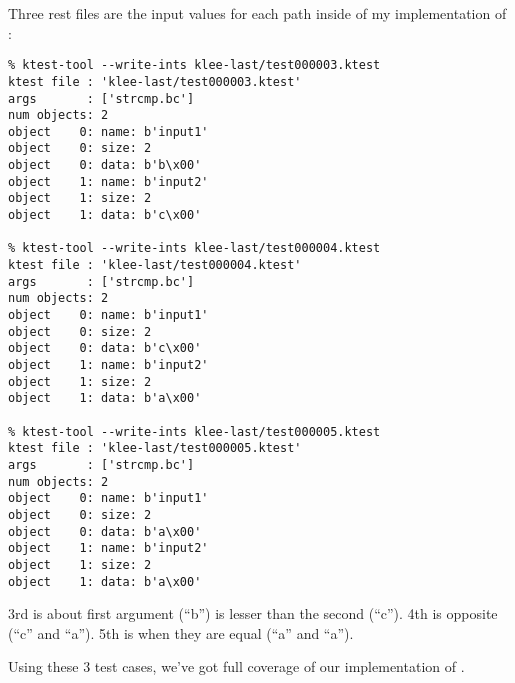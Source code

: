 Three rest files are the input values for each path inside of my implementation of :

\begin{lstlisting}
% ktest-tool --write-ints klee-last/test000003.ktest
ktest file : 'klee-last/test000003.ktest'
args       : ['strcmp.bc']
num objects: 2
object    0: name: b'input1'
object    0: size: 2
object    0: data: b'b\x00'
object    1: name: b'input2'
object    1: size: 2
object    1: data: b'c\x00'

% ktest-tool --write-ints klee-last/test000004.ktest
ktest file : 'klee-last/test000004.ktest'
args       : ['strcmp.bc']
num objects: 2
object    0: name: b'input1'
object    0: size: 2
object    0: data: b'c\x00'
object    1: name: b'input2'
object    1: size: 2
object    1: data: b'a\x00'

% ktest-tool --write-ints klee-last/test000005.ktest
ktest file : 'klee-last/test000005.ktest'
args       : ['strcmp.bc']
num objects: 2
object    0: name: b'input1'
object    0: size: 2
object    0: data: b'a\x00'
object    1: name: b'input2'
object    1: size: 2
object    1: data: b'a\x00'
\end{lstlisting}

3rd is about first argument (``b'') is lesser than the second (``c'').
4th is opposite (``c'' and ``a'').
5th is when they are equal (``a'' and ``a'').

Using these 3 test cases, we've got full coverage of our implementation of .

